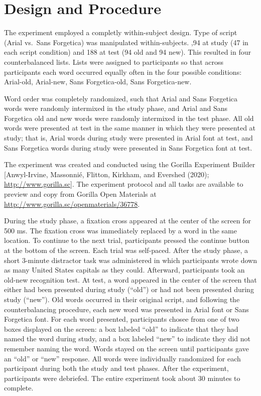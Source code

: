 \documentclass[english,pdf]{apa6}
\begin{document}
\hypertarget{design-and-procedure-2}{%
\section{Design and Procedure}\label{design-and-procedure-2}}

The experiment employed a completly within-subject design. Type of script (Arial vs.~Sans Forgetica) was manipulated within-subjects. ,94 at study (47 in each script condition) and 188 at test (94 old and 94 new). This resulted in four counterbalanced lists. Lists were assigned to participants so that across participants each word occurred equally often in the four possible conditions: Arial-old, Arial-new, Sans Forgetica-old, Sans Forgetica-new.

Word order was completely randomized, such that Arial and Sans Forgetica words were randomly intermixed in the study phase, and Arial and
Sans Forgetica old and new words were randomly intermixed in the test phase. All old words were presented at test in the same manner in which they
were presented at study; that is, Arial words during study were presented in Arial font at test, and Sans Forgetica words during study were presented in Sans Forgetica font at test.

The experiment was created and conducted using the Gorilla Experiment Builder {[}Anwyl-Irvine, Massonnié, Flitton, Kirkham, and Evershed (2020); \url{http://www.gorilla.sc}{]}. The experiment protocol and all tasks are available to preview and copy from Gorilla Open Materials at \url{http://www.gorilla.sc/openmaterials/36778}.

During the study phase, a fixation cross appeared at the center of the screen for 500 ms. The fixation cross was immediately replaced by a word in the same location. To continue to the next trial, participants pressed the continue button at the bottom of the screen. Each trial was self-paced. After the study phase, a short 3-minute distractor task was administered in which participants wrote down as many United States capitals as they could. Afterward, participants took an old-new recognition test. At test, a word appeared in the center of the screen that either had been presented during study (\enquote{old}) or had not been presented during study (\enquote{new}). Old words occurred in their original script, and following the counterbalancing procedure, each new word was presented in Arial font or Sans Forgetica font. For each word presented, participants chosee from one of two boxes displayed on the screen: a box labeled \enquote{old} to indicate that they had named the word during study, and a box labeled \enquote{new} to indicate they did not remember naming the word. Words stayed on the screen until participants gave an \enquote{old} or \enquote{new} response. All words were individually randomized for each participant during both the study and test phases. After the experiment, participants were debriefed. The entire experiment took about 30 minutes
to complete.
\end{document}
